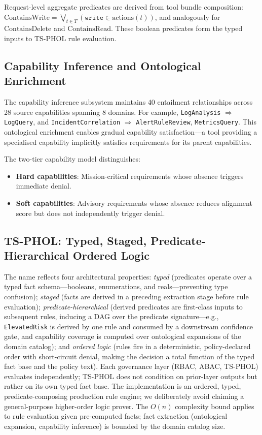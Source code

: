 \documentclass[10pt,a4paper,twocolumn]{article}
\begin{document}
Request-level aggregate predicates are derived from tool bundle composition: $\text{ContainsWrite} = \bigvee_{t \in T} (\texttt{write} \in \text{actions}(t))$, and analogously for $\text{ContainsDelete}$ and $\text{ContainsRead}$. These boolean predicates form the typed inputs to TS-PHOL rule evaluation.

\subsection{Capability Inference and Ontological Enrichment}
\label{sec:capability_inference}

The capability inference subsystem maintains 40 entailment relationships across 28 source capabilities spanning 8 domains. For example, \texttt{LogAnalysis} $\Rightarrow$ \texttt{LogQuery}, and \texttt{IncidentCorrelation} $\Rightarrow$ \texttt{AlertRuleReview}, \texttt{MetricsQuery}. This ontological enrichment enables gradual capability satisfaction---a tool providing a specialised capability implicitly satisfies requirements for its parent capabilities.

The two-tier capability model distinguishes:
\begin{itemize}
  \item \textbf{Hard capabilities}: Mission-critical requirements whose absence triggers immediate denial.
  \item \textbf{Soft capabilities}: Advisory requirements whose absence reduces alignment score but does not independently trigger denial.
\end{itemize}

\subsection{TS-PHOL: Typed, Staged, Predicate-Hierarchical Ordered Logic}
\label{sec:tsphol}

The name reflects four architectural properties: \emph{typed} (predicates operate over a typed fact schema---booleans, enumerations, and reals---preventing type confusion); \emph{staged} (facts are derived in a preceding extraction stage before rule evaluation); \emph{predicate-hierarchical} (derived predicates are first-class inputs to subsequent rules, inducing a DAG over the predicate signature---e.g., \texttt{ElevatedRisk} is derived by one rule and consumed by a downstream confidence gate, and capability coverage is computed over ontological expansions of the domain catalog); and \emph{ordered logic} (rules fire in a deterministic, policy-declared order with short-circuit denial, making the decision a total function of the typed fact base and the policy text). Each governance layer (RBAC, ABAC, TS-PHOL) evaluates independently; TS-PHOL does not condition on prior-layer outputs but rather on its own typed fact base. The implementation is an ordered, typed, predicate-composing production rule engine; we deliberately avoid claiming a general-purpose higher-order logic prover. The $O(n)$ complexity bound applies to rule evaluation given pre-computed facts; fact extraction (ontological expansion, capability inference) is bounded by the domain catalog size.
\end{document}
